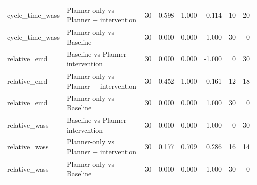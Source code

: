\begin{table}
\begin{tabular}{llrrrrrr}
cycle_time_wass & Planner-only vs Planner + intervention & 30 & 0.598 & 1.000 & -0.114 & 10 & 20 \\
cycle_time_wass & Planner-only vs Baseline & 30 & 0.000 & 0.000 & 1.000 & 30 & 0 \\
relative_emd & Baseline vs Planner + intervention & 30 & 0.000 & 0.000 & -1.000 & 0 & 30 \\
relative_emd & Planner-only vs Planner + intervention & 30 & 0.452 & 1.000 & -0.161 & 12 & 18 \\
relative_emd & Planner-only vs Baseline & 30 & 0.000 & 0.000 & 1.000 & 30 & 0 \\
relative_wass & Baseline vs Planner + intervention & 30 & 0.000 & 0.000 & -1.000 & 0 & 30 \\
relative_wass & Planner-only vs Planner + intervention & 30 & 0.177 & 0.709 & 0.286 & 16 & 14 \\
relative_wass & Planner-only vs Baseline & 30 & 0.000 & 0.000 & 1.000 & 30 & 0 \\
\bottomrule
\end{tabular}
\end{table}

